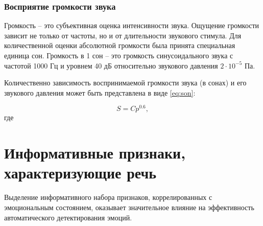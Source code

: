 \subsection{Восприятие громкости звука}

Громкость -- это субъективная оценка интенсивности звука. Ощущение громкости зависит не только от частоты, но и от длительности звукового стимула. Для количественной оценки абсолютной громкости была принята специальная единица сон. Громкость в 1 сон – это громкость синусоидального звука с частотой 1000 Гц и уровнем 40 дБ относительно звукового давления $2 \cdot 10^{-5}$ Па.

Количественно зависимость воспринимаемой громкости звука (в сонах) и его звукового давления может быть представлена в виде \ref{eq:son}:

\begin{equation}\label{eq:son}
	S = Cp^{0.6},
\end{equation}
где $$
\chapter{Информативные признаки, характеризующие речь}

Выделение информативного набора признаков, коррелированных с эмоциональным состоянием, оказывает значительное влияние на эффективность автоматического детектирования эмоций.
